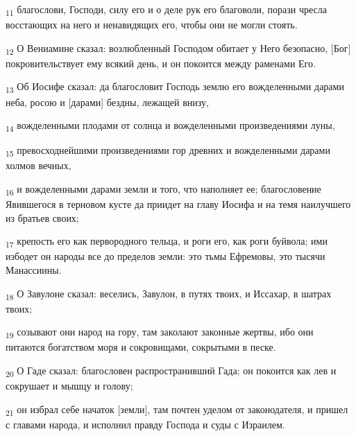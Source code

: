 \begin{tcolorbox}
\textsubscript{11} благослови, Господи, силу его и о деле рук его благоволи, порази чресла восстающих на него и ненавидящих его, чтобы они не могли стоять.
\end{tcolorbox}
\begin{tcolorbox}
\textsubscript{12} О Вениамине сказал: возлюбленный Господом обитает у Него безопасно, [Бог] покровительствует ему всякий день, и он покоится между раменами Его.
\end{tcolorbox}
\begin{tcolorbox}
\textsubscript{13} Об Иосифе сказал: да благословит Господь землю его вожделенными дарами неба, росою и [дарами] бездны, лежащей внизу,
\end{tcolorbox}
\begin{tcolorbox}
\textsubscript{14} вожделенными плодами от солнца и вожделенными произведениями луны,
\end{tcolorbox}
\begin{tcolorbox}
\textsubscript{15} превосходнейшими произведениями гор древних и вожделенными дарами холмов вечных,
\end{tcolorbox}
\begin{tcolorbox}
\textsubscript{16} и вожделенными дарами земли и того, что наполняет ее; благословение Явившегося в терновом кусте да приидет на главу Иосифа и на темя наилучшего из братьев своих;
\end{tcolorbox}
\begin{tcolorbox}
\textsubscript{17} крепость его как первородного тельца, и роги его, как роги буйвола; ими избодет он народы все до пределов земли: это тьмы Ефремовы, это тысячи Манассиины.
\end{tcolorbox}
\begin{tcolorbox}
\textsubscript{18} О Завулоне сказал: веселись, Завулон, в путях твоих, и Иссахар, в шатрах твоих;
\end{tcolorbox}
\begin{tcolorbox}
\textsubscript{19} созывают они народ на гору, там заколают законные жертвы, ибо они питаются богатством моря и сокровищами, сокрытыми в песке.
\end{tcolorbox}
\begin{tcolorbox}
\textsubscript{20} О Гаде сказал: благословен распространивший Гада; он покоится как лев и сокрушает и мышцу и голову;
\end{tcolorbox}
\begin{tcolorbox}
\textsubscript{21} он избрал себе начаток [земли], там почтен уделом от законодателя, и пришел с главами народа, и исполнил правду Господа и суды с Израилем.
\end{tcolorbox}
